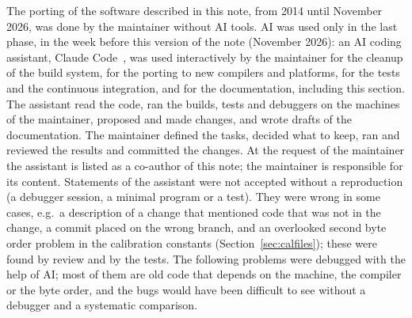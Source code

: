 The porting of the software described in this note, from 2014 until November 2026, was done by the maintainer
without AI tools. AI was used only in the last phase, in the week before this version of the note (November 2026): an AI coding assistant, Claude Code~\cite{ClaudeCode:web}, was used interactively by the maintainer for the
cleanup of the build system, for the porting to new compilers and platforms, for the tests and the continuous
integration, and for the documentation, including this section. The assistant read the code, ran the builds,
tests and debuggers on the machines of the maintainer, proposed and made changes, and wrote drafts of the
documentation. The maintainer defined the tasks, decided what to keep, ran and reviewed the results and committed
the changes. At the request of the maintainer the assistant is listed as a co-author of this note; the maintainer
is responsible for its content. Statements of the assistant were not accepted without a reproduction
(a debugger session, a minimal program or a test). They were wrong in some cases, e.g.\ a description of a change
that mentioned code that was not in the change, a commit placed on the wrong branch, and an overlooked second
byte order problem in the calibration constants (Section~\ref{sec:calfiles}); these were found by review
and by the tests. The following problems were debugged with the help of AI; most of them are old code that
depends on the machine, the compiler or the byte order, and the bugs would have been difficult to see
without a debugger and a systematic comparison.
